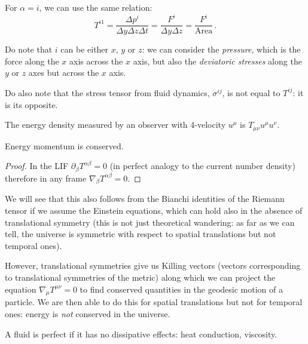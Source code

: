 \documentclass[main.tex]{subfiles}
\begin{document}
For \(\alpha = i\), we can use the same relation: 
%
\begin{equation}
  T^{i1} = \frac{\Delta p^{i}}{\Delta y \Delta z \Delta t}
  = \frac{F^{i}}{\Delta y \Delta z} = \frac{F^{i}}{\text{Area}}
\,.
\end{equation}

Do note that \(i\) can be either \(x\), \(y\) or \(z\): we can consider the \emph{pressure}, which is the force along the \(x\) axis across the \(x\) axis, but also the \emph{deviatoric stresses} along the \(y\) or \(z\) axes but across the \(x\) axis.

Do also note that the stress tensor from fluid dynamics, \(\sigma^{ij}\), is not equal to \(T^{ij}\): it is its opposite.

The energy density measured by an observer with 4-velocity \(u^{\mu }\) is \(T_{\mu \nu } u^{\mu }u^{\nu }\).

\begin{claim}
Energy momentum is conserved.
\end{claim}

\begin{proof}
In the LIF \(\partial_{\beta }T^{\alpha \beta }= 0\) (in perfect analogy to the current number density) therefore in any frame \(\nabla_{\beta }T^{\alpha \beta }= 0\).
\end{proof}

\begin{bluebox}
We will see that this also follows from the Bianchi identities of the Riemann tensor if we assume the Einstein equations, which can hold also in the absence of translational symmetry (this is not just theoretical wandering: as far as we can tell, the universe is symmetric with respect to spatial translations but not temporal ones). 

However, translational symmetries give us Killing vectors (vectors corresponding to translational symmetries of the metric) along which we can project the equation \(\nabla_{\mu } T^{\mu \nu } = 0\) to find conserved quantities in the geodesic motion of a particle. 
We are then able to do this for spatial translations but not for temporal ones: energy is \emph{not} conserved in the universe. 
\end{bluebox}

\begin{definition}
A fluid is perfect if it has no dissipative effects: heat conduction, viscosity.
\end{definition}
\end{document}
